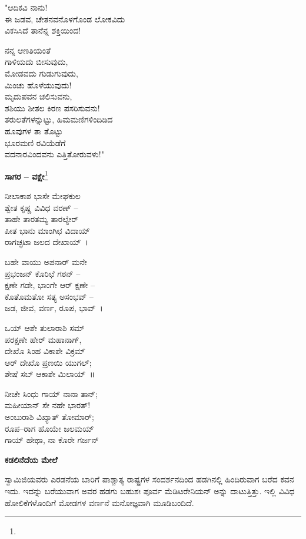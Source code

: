 "ಆದಿಕವಿ ನಾನು!\\ಈ ಜಡವ, ಚೇತನವನೊಳಗೊಂಡ ಲೋಕವಿದು\\ವಿಕಸಿಸಿದೆ ತಾನೆನ್ನ ಶಕ್ತಿಯಿಂದ!

ನನ್ನ ಆಣತಿಯಂತೆ\\ಗಾಳಿಯದು ಬೀಸುವುದು,\\ಮೋಡವದು ಗುಡುಗುವುದು,\\ಮಿಂಚು ಹೊಳೆಯುವುದು!\\
 ಮೃದುಪವನ ಚಲಿಸುವನು,\\ಶಶಿಯು ಶೀತಲ ಕಿರಣ ಪಸರಿಸುವನು!\\ತರುಲತೆಗಳನ್ನುಟ್ಟು, ಹಿಮಮಣಿಗಳಿಂದಿಡಿದ\\ಹೂವುಗಳ ತಾ ತೊಟ್ಟು\\ಭೂರಮಣಿ ರವಿಯೆಡೆಗೆ\\ವದನಾರವಿಂದವನು ಎತ್ತಿತೋರುವಳು!"

\begin{center}
\textbf{ಸಾಗರ – ವಕ್ಷೇ}\footnote{}
\end{center}

ನೀಲಾಕಾಶ ಭಾಸೇ ಮೇಘಕುಲ\\ಶ್ವೇತ ಕೃಷ್ಣ ವಿವಿಧ ವರಣ್ –\\ತಾಹೇ ತಾರತಮ್ಯ ತಾರಲ್ಯೇರ್\\ಪೀತ ಭಾನು ಮಾಂಗಿಛ ವಿದಾಯ್\\ರಾಗಚ್ಛಟಾ ಜಲದ ದೇಖಾಯ್~।

ಬಹೇ ವಾಯು ಅಪನಾರ್ ಮನೇ\\ಪ್ರಭಂಜನ್ ಕೊರಿಛೆ ಗಠನ್ –\\ಕ್ಷಣೇ ಗಡೇ, ಭಾಂಗೇ ಆರ್ ಕ್ಷಣೇ –\\ಕೊತೊಮತೋ ಸತ್ಯ ಅಸಂಭವ್ –\\ಜಡ, ಜೀವ, ವರ್ಣ, ರೂಪ, ಭಾವ್~।

ಒಯ್ ಆಶೇ ತುಲಾರಾಶಿ ಸಮ್\\ಪರಕ್ಷಣೇ ಹೇರ್‌ ಮಹಾನಾಗ್,\\ದೇಖೊ ಸಿಂಹ ವಿಕಾಶೇ ವಿಕ್ರಮ್\\ಆರ್ ದೇಖೊ ಪ್ರಣಯಿ ಯುಗಲ್;\\ಶೇಷೆ ಸಬ್ ಆಕಾಶೇ ಮಿಲಾಯ್~॥

ನೀಚೇ ಸಿಂಧು ಗಾಯ್ ನಾನಾ ತಾನ್;\\ಮಹೀಯಾನ್ ಸೇ ನಹೇ ಭಾರತ್!\\ಅಂಬುರಾಶಿ ವಿಖ್ಯಾತ್ ತೋಮಾರ್;\\ರೂಪ–ರಾಗ ಹೊಯೇ ಜಲಮಯ್\\ಗಾಯ್ ಹೇಥಾ, ನಾ ಕೊರೇ ಗರ್ಜನ್

\begin{center}
\textbf{ಕಡಲಿನೆದೆಯ ಮೇಲೆ}
\end{center}

ಸ್ವಾಮಿಜಿಯವರು ಎರಡನೆಯ ಬಾರಿಗೆ ಪಾಶ್ಚಾತ್ಯ ರಾಷ್ಟ್ರಗಳ ಸಂದರ್ಶನದಿಂದ ಹಡಗಿನಲ್ಲಿ ಹಿಂದಿರುವಾಗ ಬರೆದ ಕವನ ಇದು. ಇದನ್ನು ಬರೆಯುವಾಗ ಅವರ ಹಡಗು ಬಹುಶಃ ಪೂರ್ವ ಮೆಡಿಟರೇನಿಯನ್‌ ಅನ್ನು ದಾಟುತ್ತಿತ್ತು. ಇಲ್ಲಿ ವಿವಿಧ ಹೋಲಿಕೆಗಳೊಂದಿಗೆ ಮೋಡಗಳ ವರ್ಣನೆ ಮನೋಜ್ಞವಾಗಿ ಮೂಡಿಬಂದಿದೆ.

